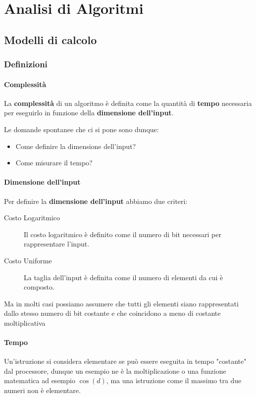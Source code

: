 \chapter{Analisi di Algoritmi}
\thispagestyle{chapterInit}
\section{Modelli di calcolo}
    \subsection{Definizioni}    
        \subsubsection{Complessità}
            \begin{definition}
                La \textbf{complessità} di un algoritmo è definita come la quantità di \textbf{tempo} necessaria per eseguirlo in funzione della \textbf{dimensione dell'input}.
            \end{definition}
            Le domande spontanee che ci si pone sono dunque:
            \begin{itemize}
                \item Come definire la dimensione dell'input?
                \item Come misurare il tempo?
            \end{itemize}
        \subsubsection{Dimensione dell'input}
            \begin{definition}
                Per definire la \textbf{dimensione dell'input} abbiamo due criteri:
                \begin{description}
                    \item[Costo Logaritmico] Il costo logaritmico è definito come il numero di bit necessari per rappresentare l'input.
                    \item[Costo Uniforme] La taglia dell'input è definita come il numero di elementi da cui è composto. 
                \end{description}
            \end{definition}
            Ma in molti casi possiamo assumere che tutti gli elementi siano rappresentati dallo stesso numero di bit costante e che coincidono a meno di costante moltiplicativa
        \subsubsection{Tempo}
            \begin{definition} 
                Un'istruzione si considera elementare se può essere eseguita in tempo "costante" dal processore, dunque un esempio ne è la moltiplicazione o una funzione matematica ad esempio $\cos(d)$, ma una istruzione come il massimo tra due numeri non è elementare.
            \end{definition}
